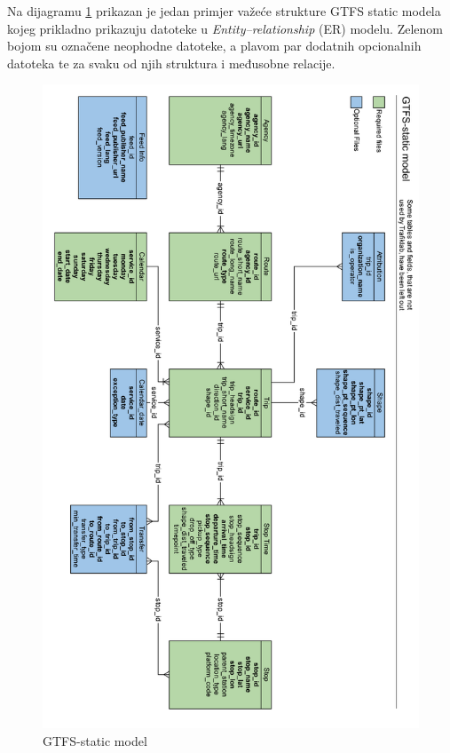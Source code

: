 \documentclass[zavrsnirad]{fer}
\begin{document}
Na dijagramu \ref{slk:gtfs-model} prikazan je jedan primjer važeće strukture GTFS static modela kojeg prikladno prikazuju datoteke u \textit{Entity–relationship} (ER) modelu. Zelenom bojom su označene neophodne datoteke, a plavom par dodatnih opcionalnih datoteka te za svaku od njih struktura i međusobne relacije. 

\begin{figure}[H]
	\centering
	\includegraphics[width=\linewidth-30pt]{Figures/gtfs-model.png}
	\caption{GTFS-static model \cite{GTFS-schedule-model}}
	\label{slk:gtfs-model}
\end{figure}
\end{document}
